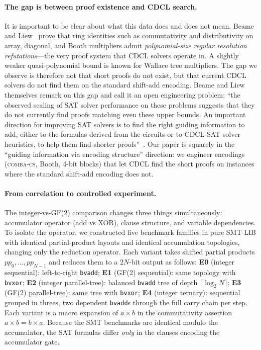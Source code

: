 \documentclass[a4paper]{ceurart}
\newcommand{\combacs}{\textsc{comba-cs}\xspace}
\begin{document}
\paragraph{The gap is between proof existence and CDCL search.}
It is important to be clear about what this data does and does
not mean. Beame and Liew~\cite{beame2017towards,beame2019toward}
prove that ring identities such as commutativity and
distributivity on array, diagonal, and Booth multipliers admit
\emph{polynomial-size regular resolution refutations}---the very
proof system that CDCL solvers operate in. A slightly weaker
quasi-polynomial bound is known for Wallace tree multipliers.
The gap we observe is therefore not that short proofs do not
exist, but that current CDCL solvers do not find them on the
standard shift-add encoding. Beame and Liew themselves remark
on this gap and call it an open engineering problem: ``the
observed scaling of SAT solver performance on these problems
suggests that they do not currently find proofs matching even
these upper bounds. An important direction for improving SAT
solvers is to find the right guiding information to add, either
to the formulas derived from the circuits or to CDCL SAT solver
heuristics, to help them find shorter proofs''~\cite{beame2019toward}.
Our paper is squarely in the ``guiding information via encoding
structure'' direction: we engineer encodings (\combacs, Booth,
4-bit blocks) that let CDCL find the short proofs on instances
where the standard shift-add encoding does not.

\paragraph{From correlation to controlled experiment.}
The integer-vs-GF(2) comparison changes three things simultaneously:
accumulator operator (add vs XOR), clause structure, and variable
dependencies. To isolate the operator, we constructed five
benchmark families in pure SMT-LIB with identical partial-product
layouts and identical accumulation topologies, changing only the
reduction operator. Each variant takes shifted partial products
$\mathit{pp}_0, \ldots, \mathit{pp}_{N-1}$ and reduces them to a
$2N$-bit output as follows:
\textbf{E0} (integer sequential): left-to-right \texttt{bvadd};
\textbf{E1} (GF(2) sequential): same topology with \texttt{bvxor};
\textbf{E2} (integer parallel-tree): balanced \texttt{bvadd} tree
of depth $\lceil \log_2 N \rceil$;
\textbf{E3} (GF(2) parallel-tree): same tree with \texttt{bvxor};
\textbf{E4} (integer ternary): sequential grouped in threes,
two dependent \texttt{bvadd}s through the full carry chain per step.
Each variant is a macro expansion of $a \times b$ in the
commutativity assertion $a \times b = b \times a$. Because the SMT
benchmarks are identical modulo the accumulator, the SAT formulas
differ \emph{only} in the clauses encoding the accumulator gate.
\end{document}
